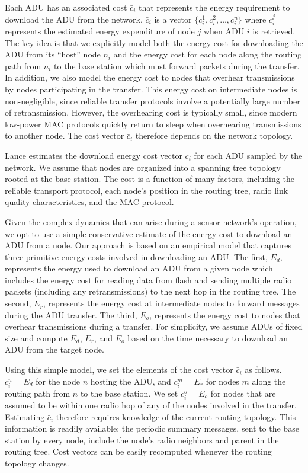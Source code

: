 Each ADU has an associated cost $\bar{c}_i$ that represents the energy
requirement to download the ADU from the network.  $\bar{c}_i$ is a vector
$\{ c_i^1, c_i^2, \ldots, c_i^n \}$ where $c_i^j$ represents the estimated
energy expenditure of node $j$ when ADU $i$ is retrieved. The key idea is
that we explicitly model both the energy cost for downloading the ADU from
its ``host'' node $n_i$ and the energy cost for each node along the
routing path from $n_i$ to the base station which must forward packets during
the transfer. In addition, we also model the energy cost to nodes that
overhear transmissions by nodes participating in the transfer.  This energy
cost on intermediate nodes is non-negligible, since reliable transfer
protocols involve a potentially large number of retransmission. However, the
overhearing cost is typically small, since modern low-power MAC protocols
quickly return to sleep when overhearing transmissions to another node.  The
cost vector $\bar{c}_i$ therefore depends on the network topology.

Lance estimates the download energy cost vector $\bar{c}_i$ for each ADU
sampled by the network.  We assume that nodes are organized into a spanning
tree topology rooted at the base station. The cost is a function of many
factors, including the reliable transport protocol, each node's position in
the routing tree, radio link quality characteristics, and the MAC protocol. 

Given the complex dynamics that can arise during a sensor network's
operation, we opt to use a simple conservative estimate of the energy cost to
download an ADU from a node. Our approach is based on an empirical model that
captures three primitive energy costs involved in downloading an ADU. The
first, $E_d$, represents the energy used to download an ADU from a given node
which includes the energy cost for reading data from flash and sending
multiple radio packets (including any retransmissions) to the next hop in the
routing tree.  The second, $E_r$, represents the energy cost at intermediate
nodes to forward messages during the ADU transfer. The third, $E_o$,
represents the energy cost to nodes that overhear transmissions during a
transfer.  For simplicity, we assume ADUs of fixed size and compute $E_d$,
$E_r$, and $E_o$ based on the time necessary to download an ADU from the
target node.

Using this simple model, we set the elements of the cost vector $\bar{c}_i$ 
as follows. $c_i^n = E_d$ for the node $n$ hosting the ADU, and 
$c_i^m = E_r$ for nodes $m$ along the routing path from
$n$ to the base station. We set $c_i^o = E_o$ for nodes that are
assumed to be within one radio hop of any of the nodes involved in
the transfer. Estimating $\bar{c}_i$ therefore requires
knowledge of the current routing topology. This information 
is readily available: the periodic summary messages, sent to the 
base station by every node, include the node's radio neighbors and 
parent in the routing tree. Cost vectors can be easily recomputed 
whenever the routing topology changes.

